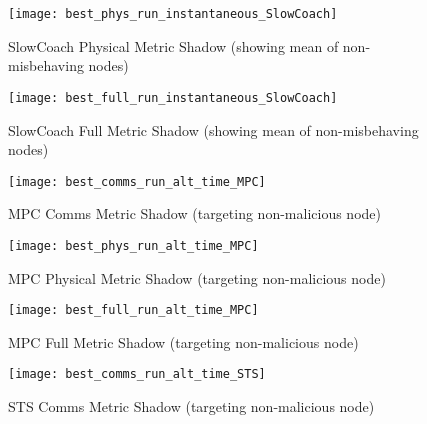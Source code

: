 \documentclass[aspectratio=43]{beamer}
\begin{document}
\begin{frame}\begin{figure}[h]
	\centering
	\texttt{[image: best\_phys\_run\_instantaneous\_SlowCoach]}
	\caption{SlowCoach Physical Metric Shadow (showing mean of non-misbehaving nodes)}
	\label{fig:phys_instantaneous_slowcoach}
\end{figure}\end{frame}

\begin{frame}\begin{figure}[h]
	\centering
	\texttt{[image: best\_full\_run\_instantaneous\_SlowCoach]}
	\caption{SlowCoach Full Metric Shadow (showing mean of non-misbehaving nodes)}
	\label{fig:full_instantaneous_slowcoach}
\end{figure}\end{frame}


\begin{frame}\begin{figure}[h]
	\centering
	\texttt{[image: best\_comms\_run\_alt\_time\_MPC]}
	\caption{MPC Comms Metric Shadow (targeting non-malicious node)}
	\label{fig:comms_alt_time_mpc}
\end{figure}\end{frame}

\begin{frame}\begin{figure}[h]
	\centering
	\texttt{[image: best\_phys\_run\_alt\_time\_MPC]}
	\caption{MPC Physical Metric Shadow (targeting non-malicious node)}
	\label{fig:phys_alt_time_mpc}
\end{figure}\end{frame}

\begin{frame}\begin{figure}[h]
	\centering
	\texttt{[image: best\_full\_run\_alt\_time\_MPC]}
	\caption{MPC Full Metric Shadow (targeting non-malicious node)}
	\label{fig:full_alt_time_mpc}
\end{figure}\end{frame}


\begin{frame}\begin{figure}[h]
	\centering
	\texttt{[image: best\_comms\_run\_alt\_time\_STS]}
	\caption{STS Comms Metric Shadow (targeting non-malicious node)}
	\label{fig:comms_alt_time_sts}
\end{figure}\end{frame}
\end{document}
